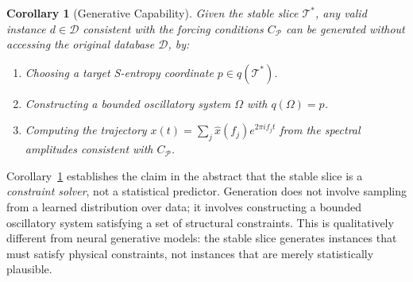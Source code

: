 \documentclass[10pt,twocolumn]{article}
\newtheorem{corollary}[theorem]{Corollary}
\newcommand{\TruthCell}{\mathcal{T}}
\newcommand{\PurposePoint}{\mathcal{P}}
\newcommand{\DataSpace}{\mathcal{D}}
\begin{document}
\begin{corollary}[Generative Capability]
\label{cor:generative}
Given the stable slice $\TruthCell^*$, any valid instance $d \in \DataSpace$
consistent with the forcing conditions $C_\PurposePoint$ can be generated
without accessing the original database $\DataSpace$, by:
\begin{enumerate}[label=(\roman*)]
\item Choosing a target S-entropy coordinate $p \in q(\TruthCell^*)$.
\item Constructing a bounded oscillatory system $\Omega$ with $q(\Omega) = p$.
\item Computing the trajectory $x(t) = \sum_j \hat{x}(f_j) e^{2\pi i f_j t}$
      from the spectral amplitudes consistent with $C_\PurposePoint$.
\end{enumerate}
\end{corollary}

Corollary~\ref{cor:generative} establishes the claim in the abstract that
the stable slice is a \emph{constraint solver}, not a statistical predictor.
Generation does not involve sampling from a learned distribution over data;
it involves constructing a bounded oscillatory system satisfying a set
of structural constraints. This is qualitatively different from neural
generative models: the stable slice generates instances that must satisfy
physical constraints, not instances that are merely statistically plausible.
\end{document}
